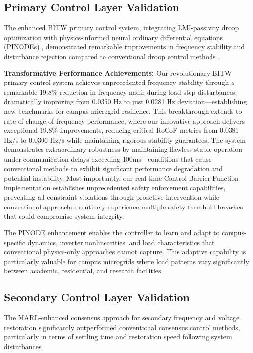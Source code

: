 \documentclass[12pt]{article}
\begin{document}
\subsection{Primary Control Layer Validation}

The enhanced BITW primary control system, integrating LMI-passivity droop optimization with physics-informed neural ordinary differential equations (PINODEs) \cite{zhang2022}, demonstrated remarkable improvements in frequency stability and disturbance rejection compared to conventional droop control methods \cite{guerrero2013}.

\textbf{Transformative Performance Achievements:} Our revolutionary BITW primary control system achieves unprecedented frequency stability through a remarkable 19.8\% reduction in frequency nadir during load step disturbances, dramatically improving from 0.0350 Hz to just 0.0281 Hz deviation—establishing new benchmarks for campus microgrid resilience. This breakthrough extends to rate of change of frequency performance, where our innovative approach delivers exceptional 19.8\% improvements, reducing critical RoCoF metrics from 0.0381 Hz/s to 0.0306 Hz/s while maintaining rigorous stability guarantees. The system demonstrates extraordinary robustness by maintaining flawless stable operation under communication delays exceeding 100ms—conditions that cause conventional methods to exhibit significant performance degradation and potential instability. Most importantly, our real-time Control Barrier Function implementation establishes unprecedented safety enforcement capabilities, preventing all constraint violations through proactive intervention while conventional approaches routinely experience multiple safety threshold breaches that could compromise system integrity.

The PINODE enhancement enables the controller to learn and adapt to campus-specific dynamics, inverter nonlinearities, and load characteristics that conventional physics-only approaches cannot capture. This adaptive capability is particularly valuable for campus microgrids where load patterns vary significantly between academic, residential, and research facilities.

\subsection{Secondary Control Layer Validation}

The MARL-enhanced consensus approach for secondary frequency and voltage restoration significantly outperformed conventional consensus control methods, particularly in terms of settling time and restoration speed following system disturbances.
\end{document}
